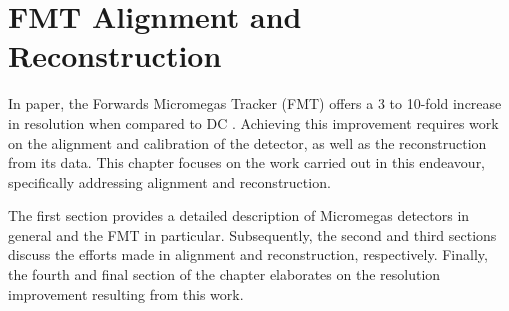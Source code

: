 \section{FMT Alignment and Reconstruction}
\label{12::fmt_alignment_and_reconstruction}
    In paper, the Forwards Micromegas Tracker (FMT) offers a 3 to 10-fold increase in resolution when compared to DC \cite{aune2009}.
    Achieving this improvement requires work on the alignment and calibration of the detector, as well as the reconstruction from its data.
    This chapter focuses on the work carried out in this endeavour, specifically addressing alignment and reconstruction.

    The first section provides a detailed description of Micromegas detectors in general and the FMT in particular.
    Subsequently, the second and third sections discuss the efforts made in alignment and reconstruction, respectively.
    Finally, the fourth and final section of the chapter elaborates on the resolution improvement resulting from this work.

    
    
    
    
